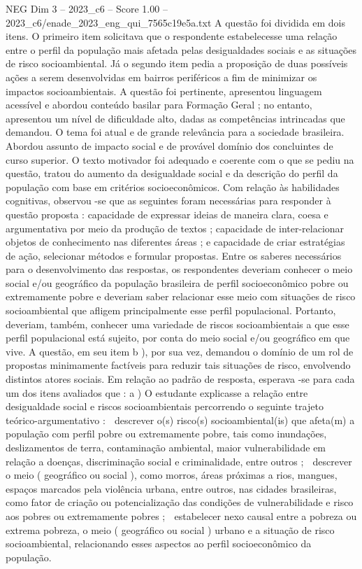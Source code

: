 \begin{textsample}{NEG Dim 3 – 2023\_c6 – Score 1.00 – 2023\_c6/enade\_2023\_eng\_qui\_7565c19e5a.txt}
A questão foi dividida em dois itens.
O primeiro item solicitava que o respondente estabelecesse uma relação entre o perfil da população mais afetada pelas desigualdades sociais e as situações de risco socioambiental.
Já o segundo item pedia a proposição de duas possíveis ações a serem desenvolvidas em bairros periféricos a fim de minimizar os impactos socioambientais.
A questão foi pertinente, apresentou linguagem acessível e abordou conteúdo basilar para Formação Geral ; no entanto, apresentou um nível de dificuldade alto, dadas as competências intrincadas que demandou.
O tema foi atual e de grande relevância para a sociedade brasileira.
Abordou assunto de impacto social e de provável domínio dos concluintes de curso superior.
O texto motivador foi adequado e coerente com o que se pediu na questão, tratou do aumento da desigualdade social e da descrição do perfil da população com base em critérios socioeconômicos.
Com relação às habilidades cognitivas, observou -se que as seguintes foram necessárias para responder à questão proposta : capacidade de expressar ideias de maneira clara, coesa e argumentativa por meio da produção de textos ; capacidade de inter-relacionar objetos de conhecimento nas diferentes áreas ; e capacidade de criar estratégias de ação, selecionar métodos e formular propostas.
Entre os saberes necessários para o desenvolvimento das respostas, os respondentes deveriam conhecer o meio social e/ou geográfico da população brasileira de perfil socioeconômico pobre ou extremamente pobre e deveriam saber relacionar esse meio com situações de risco socioambiental que afligem principalmente esse perfil populacional.
Portanto, deveriam, também, conhecer uma variedade de riscos socioambientais a que esse perfil populacional está sujeito, por conta do meio social e/ou geográfico em que vive.
A questão, em seu item b ), por sua vez, demandou o domínio de um rol de propostas minimamente factíveis para reduzir tais situações de risco, envolvendo distintos atores sociais.
Em relação ao padrão de resposta, esperava -se para cada um dos itens avaliados que : a ) O estudante explicasse a relação entre desigualdade social e riscos socioambientais percorrendo o seguinte trajeto teórico-argumentativo :  descrever o(s) risco(s) socioambiental(is) que afeta(m) a população com perfil pobre ou extremamente pobre, tais como inundações, deslizamentos de terra, contaminação ambiental, maior vulnerabilidade em relação a doenças, discriminação social e criminalidade, entre outros ;  descrever o meio ( geográfico ou social ), como morros, áreas próximas a rios, mangues, espaços marcados pela violência urbana, entre outros, nas cidades brasileiras, como fator de criação ou potencialização das condições de vulnerabilidade e risco aos pobres ou extremamente pobres ;  estabelecer nexo causal entre a pobreza ou extrema pobreza, o meio ( geográfico ou social ) urbano e a situação de risco socioambiental, relacionando esses aspectos ao perfil socioeconômico da população.

\end{textsample}

